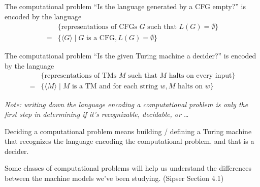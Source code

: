 \documentclass[12pt, oneside]{article}
\begin{document}
The computational problem ``Is the language generated by a CFG empty?'' is encoded by the language
\begin{align*}
  &\{ \textrm{representations of CFGs $G$  such that $L(G) = \emptyset$}\}  \\
  =& \{ \langle G \rangle \mid G \textrm{ is a CFG},  L(G) = \emptyset \}
\end{align*}



The computational problem ``Is the given Turing machine a decider?'' is encoded by the language
\begin{align*}
  &\{ \textrm{representations of TMs $M$  such that $M$ halts on every input}\}  \\
  =& \{ \langle M \rangle \mid M \textrm{ is a TM and for each string } w, \textrm{$M$ halts on $w$} \}
\end{align*}


{\it Note: writing down the language encoding a computational problem is only the first step in 
determining if it's recognizable, decidable, or \ldots }

Deciding a computational problem means building / defining a Turing 
machine that recognizes the language encoding the computational problem, and that 
is a decider.


Some classes of computational problems will 
help us understand the differences between the machine models we've been studying. (Sipser Section 4.1)
\end{document}
